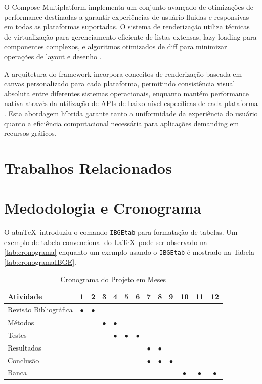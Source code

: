 \documentclass[
	12pt,				    %
	openright,			    %
	oneside,			    %
	a4paper,			    %
    sumario=tradicional,    %
	english,			    %
	brazil,				    %
	]{abntex2}              %
\begin{document}
O Compose Multiplatform implementa um conjunto avançado de otimizações de performance destinadas a garantir experiências de usuário fluidas e responsivas em todas as plataformas suportadas. O sistema de renderização utiliza técnicas de virtualização para gerenciamento eficiente de listas extensas, lazy loading para componentes complexos, e algoritmos otimizados de diff para minimizar operações de layout e desenho \cite{compose2023performance}.

A arquitetura do framework incorpora conceitos de renderização baseada em canvas personalizado para cada plataforma, permitindo consistência visual absoluta entre diferentes sistemas operacionais, enquanto mantém performance nativa através da utilização de APIs de baixo nível específicas de cada plataforma \cite{skia2023graphics}. Esta abordagem híbrida garante tanto a uniformidade da experiência do usuário quanto a eficiência computacional necessária para aplicações demanding em recursos gráficos.

\chapter{Trabalhos Relacionados}\label{sec:TrabRel}

\chapter{Medodologia e Cronograma}\label{sec:metodos}

O abn\TeX\ introduziu o comando \texttt{IBGEtab} para formatação de tabelas. Um exemplo de tabela convencional do \LaTeX\ pode ser observado na \autoref{tab:cronograma} enquanto um exemplo usando o \texttt{IBGEtab} é mostrado na Tabela \ref{tab:cronogramaIBGE}.

\begin{table}[htbp]
  \centering
    \caption[Cronograma Normal]{Cronograma do Projeto em Meses}
    \label{tab:cronograma}
    \begin{tabular}{lcccccccccccc} %
    \toprule
    \textbf{Atividade} & \textbf{1} & \textbf{2} & \textbf{3} & \textbf{4} & \textbf{5} & \textbf{6} & \textbf{7} & \textbf{8} & \textbf{9} & \textbf{10} & \textbf{11} & \textbf{12} \\
    \midrule
        Revisão Bibliográfica & $\bullet$ & $\bullet$ & & & & & & & & & & \\
        Métodos & & & $\bullet$ & $\bullet$ & & & & & & & & \\
        Testes & & & & $\bullet$ & $\bullet$ & $\bullet$ & & & & & & \\
        Resultados & & & & & & & $\bullet$ & $\bullet$ & & & & \\
        Conclusão & & & & & & & $\bullet$ & $\bullet$ & $\bullet$ & & & \\
        Banca & & & & & & &&&& $\bullet$ & $\bullet$ & $\bullet$ \\
    \bottomrule
    \end{tabular}%
\end{table}%
\end{document}

